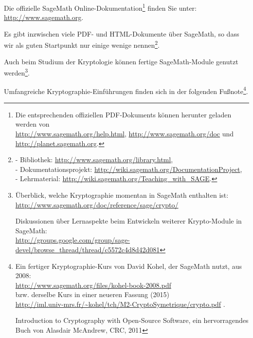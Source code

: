 \noindent Die offizielle SageMath Online-Dokumentation\footnote{%
  Die entsprechenden offiziellen PDF-Dokuments können herunter geladen werden von\\
  \url{http://www.sagemath.org/help.html}, \url{http://www.sagemath.org/doc} und \url{http://planet.sagemath.org}.
} finden Sie unter: \url{http://www.sagemath.org}.


\noindent Es gibt inzwischen viele PDF- und HTML-Dokumente über SageMath, so dass wir als guten Startpunkt nur einige wenige nennen\footnote{%
- \glqq Bibliothek\grqq: {\centering \url{http://www.sagemath.org/library.html}},\\
- \glqq Dokumentationsprojekt\grqq:
  {\centering \url{http://wiki.sagemath.org/DocumentationProject}},\\
- \glqq Lehrmaterial\grqq: {\centering \url{http://wiki.sagemath.org/Teaching_with_SAGE}}.
}.

\noindent Auch beim Studium der Kryptologie können fertige SageMath-Module genutzt
werden\footnote{%
\noindent\hangindent=6pt\makebox[6pt][l]{-}Überblick,
   welche Kryptographie momentan in SageMath enthalten ist:\\
   \url{http://www.sagemath.org/doc/reference/sage/crypto/}

\noindent\hangindent=6pt\makebox[6pt][l]{-}Diskussionen
   über Lernaspekte beim Entwickeln weiterer Krypto-Module in SageMath:\\
   \url{http://groups.google.com/group/sage-devel/browse_thread/thread/c5572c4d8d42d081}
}.

\noindent Umfangreiche Kryptographie-Einführungen finden sich in der folgenden Fußnote\footnote{%
\noindent\hangindent=6pt\makebox[6pt][l]{-}Ein fertiger Kryptographie-Kurs von David Kohel,
  der SageMath nutzt, aus 2008:\\
  {\centering \url{http://www.sagemath.org/files/kohel-book-2008.pdf} }\\
  bzw. derselbe Kurs in einer neueren Fassung (2015)\\
  {\centering \url{http://iml.univ-mrs.fr/~kohel/tch/M2-CryptoSymetrique/crypto.pdf} }.

\noindent\hangindent=6pt\makebox[6pt][l]{-}\glqq Introduction to Cryptography with
  Open-Source Software\grqq, ein hervorragendes Buch von Alasdair McAndrew, CRC, 2011
}.


